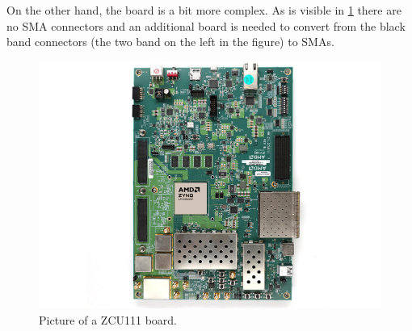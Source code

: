 On the other hand, the \ZCU board is a bit more complex. As is visible in \cref{fig:zcu111} there are no SMA connectors and an additional board is needed to convert from the black band connectors (the two band on the left in the figure) to SMAs.
\begin{figure}[ht]
    \centering
    \includegraphics[width=\textwidth]{Setup-software/figures/zcu111.jpg}
    \caption{Picture of a ZCU111 board.}
    \label{fig:zcu111}
\end{figure}

